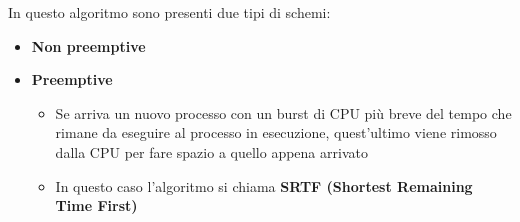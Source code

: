 \documentclass[a4paper]{article}
\begin{document}
\vspace{1em}
\noindent
In questo algoritmo sono presenti due tipi di schemi:
\begin{itemize}
  \item \textbf{Non preemptive}
  \item \textbf{Preemptive}
    \begin{itemize}
      \item Se arriva un nuovo processo con un burst di CPU più breve del tempo che
        rimane da eseguire al processo in esecuzione, quest'ultimo viene rimosso
        dalla CPU per fare spazio a quello appena arrivato
      \item In questo caso l'algoritmo si chiama \textbf{SRTF (Shortest Remaining Time First)}
    \end{itemize}
\end{itemize}
\end{document}
